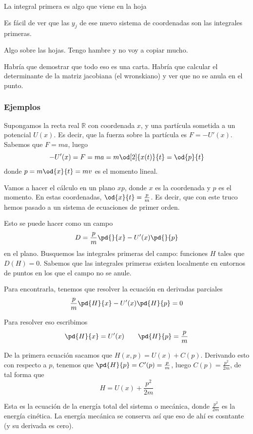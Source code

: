 \begin{defn} La integral primera es algo que viene en la hoja

\end{defn}

Es fácil de ver que las $y_j$ de ese nuevo sistema de coordenadas son las integrales primeras.

Algo sobre las hojas. Tengo hambre y no voy a copiar mucho.

Habría que demostrar que todo eso es una carta. Habría que calcular el determinante de la matriz jacobiana (el wronskiano) y ver que no se anula en el punto.

\subsubsection{Ejemplos}

Supongamos la recta real $ℝ$ con coordenada $x$, y una partícula sometida a un potencial $U(x)$. Es decir, que la fuerza sobre la partícula es $F = -U'(x)$. Sabemos que $F = ma$, luego \[ -U'(x) = F = m a = m \od[2]{x(t)}{t} = \od{p}{t} \] donde $p = m \od{x}{t} = mv$ es el momento lineal.

Vamos a hacer el cálculo en un plano $xp$, donde $x$ es la coordenada y $p$ es el momento. En estas coordenadas, $\od{x}{t} = \frac{p}{m}$. Es decir, que con este truco hemos pasado a un sistema de ecuaciones de primer orden.

Esto se puede hacer como un campo \[ D = \frac{p}{m}\pd{}{x} - U'(x) \pd{}{p} \] en el plano. Busquemos las integrales primeras del campo: funciones $H$ tales que $D(H) = 0$. Sabemos que las integrales primeras existen localmente en entornos de puntos en los que el campo no se anule.

Para encontrarla, tenemos que resolver la ecuación en derivadas parciales \[ \frac{p}{m} \pd{H}{x} - U'(x) \pd{H}{p} = 0 \]

Para resolver eso escribimos \[ \pd{H}{x} = U'(x) \qquad \pd{H}{p} = \frac{p}{m}\]

De la primera ecuación sacamos que $H(x,p) = U(x) + C(p)$. Derivando esto con respecto a $p$, tenemos que $\pd{H}{p} = C'(p) = \frac{p}{m}$, luego $C(p) = \frac{p^2}{2m}$, de tal forma que \[ H = U(x) + \frac{p^2}{2m} \]

Esta es la ecuación de la energía total del sistema o mecánica, donde $\frac{p^2}{2m}$ es la energía cinética. La energía mecánica se conserva así que eso de ahí es cosntante (y su derivada es cero).

